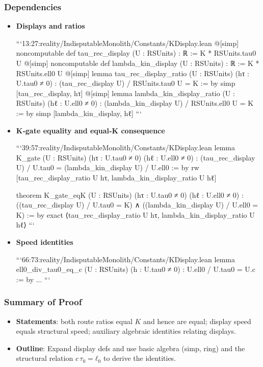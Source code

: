 \documentclass{article}
\begin{document}
\subsubsection{Dependencies}
\begin{itemize}[leftmargin=*]
  \item \textbf{Displays and ratios}

```13:27:reality/IndisputableMonolith/Constants/KDisplay.lean
@[simp] noncomputable def tau_rec_display (U : RSUnits) : ℝ := K * RSUnits.tau0 U
@[simp] noncomputable def lambda_kin_display (U : RSUnits) : ℝ := K * RSUnits.ell0 U
@[simp] lemma tau_rec_display_ratio (U : RSUnits) (hτ : U.tau0 ≠ 0) :
  (tau_rec_display U) / RSUnits.tau0 U = K := by
  simp [tau_rec_display, hτ]
@[simp] lemma lambda_kin_display_ratio (U : RSUnits) (hℓ : U.ell0 ≠ 0) :
  (lambda_kin_display U) / RSUnits.ell0 U = K := by
  simp [lambda_kin_display, hℓ]
```

  \item \textbf{K‑gate equality and equal‑K consequence}

```39:57:reality/IndisputableMonolith/Constants/KDisplay.lean
lemma K_gate (U : RSUnits) (hτ : U.tau0 ≠ 0) (hℓ : U.ell0 ≠ 0) :
  (tau_rec_display U) / U.tau0 = (lambda_kin_display U) / U.ell0 := by
  rw [tau_rec_display_ratio U hτ, lambda_kin_display_ratio U hℓ]

theorem K_gate_eqK (U : RSUnits) (hτ : U.tau0 ≠ 0) (hℓ : U.ell0 ≠ 0) :
  ((tau_rec_display U) / U.tau0 = K) ∧ ((lambda_kin_display U) / U.ell0 = K) := by
  exact ⟨tau_rec_display_ratio U hτ, lambda_kin_display_ratio U hℓ⟩
```

  \item \textbf{Speed identities}

```66:73:reality/IndisputableMonolith/Constants/KDisplay.lean
lemma ell0_div_tau0_eq_c (U : RSUnits) (h : U.tau0 ≠ 0) : U.ell0 / U.tau0 = U.c := by ...
```
\end{itemize}

\subsubsection{Summary of Proof}
\begin{itemize}[leftmargin=*]
  \item \textbf{Statements}: both route ratios equal \(K\) and hence are equal; display speed equals structural speed; auxiliary algebraic identities relating displays.
  \item \textbf{Outline}: Expand display defs and use basic algebra (simp, ring) and the structural relation \(c\,τ_0=ℓ_0\) to derive the identities.
\end{itemize}
\end{document}
